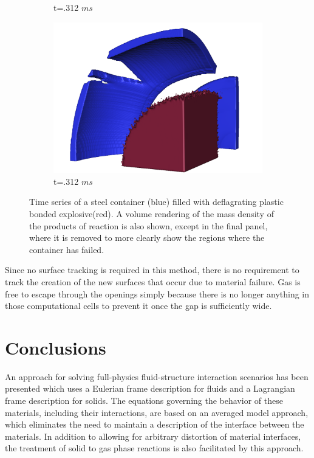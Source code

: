 \begin{figure}[t!]
\begin{subfigure}[b]{0.3\textwidth}
   \caption{t=.312 $ms$}
   \label{figCookoff:e}
 \end{subfigure}
 \begin{subfigure}[b]{0.3\textwidth}
   \includegraphics[width=\textwidth]{Figs/mpmice/NE_172_d.png}
   \caption{t=.312 $ms$}
   \label{figCookoff:f}
 \end{subfigure}
 \caption{Time series of a steel container (blue) filled with deflagrating 
          plastic bonded explosive(red).  A volume rendering of the mass 
          density of the products of reaction is also shown, except in the 
          final panel, where it is removed to more clearly show the regions 
          where the container has failed. }
 \label{figCookoff}
 \end{figure}

Since no surface tracking is required in this method, there is no
requirement to track the creation of the new surfaces that occur
due to material failure.  Gas is free to escape through the openings
simply because there is no longer anything in those computational
cells to prevent it once the gap is sufficiently wide.

\section{Conclusions} 

An approach for solving full-physics fluid-structure interaction scenarios 
has been presented which uses a Eulerian frame description for fluids and 
a Lagrangian frame description for solids.  The equations governing the 
behavior of these materials, including their interactions, are based on an 
averaged model approach, which eliminates the need to maintain a description 
of the interface between the materials.  In addition to allowing for 
arbitrary distortion of material interfaces, the treatment of solid to gas 
phase reactions is also facilitated by this approach.

